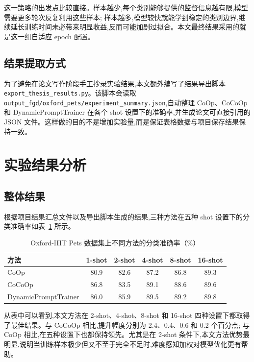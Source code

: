 这一策略的出发点比较直接。样本越少,每个类别能够提供的监督信息越有限,模型需要更多轮次反复利用这些样本; 样本越多,模型较快就能学到稳定的类别边界,继续延长训练时间未必带来明显收益,反而可能加剧过拟合。本文最终结果采用的就是这一组自适应 epoch 配置。

\subsection{结果提取方式}

为了避免在论文写作阶段手工抄录实验结果,本文额外编写了结果导出脚本 \texttt{export\_thesis\_results.py}。该脚本会读取 \texttt{output\_fgd/oxford\_pets/experiment\_summary.json},自动整理 CoOp、CoCoOp 和 DynamicPromptTrainer 在各个 shot 设置下的准确率,并生成论文可直接引用的 JSON 文件。这样做的目的不是增加实验量,而是保证表格数据与项目保存结果保持一致。

\section{实验结果分析}

\subsection{整体结果}

根据项目结果汇总文件以及导出脚本生成的结果,三种方法在五种 shot 设置下的分类准确率如表~\ref{tab:main_results} 所示。

\begin{table}[H]
\centering
\caption{Oxford-IIIT Pets 数据集上不同方法的分类准确率（\%）}
\label{tab:main_results}
\begin{tabular}{lccccc}
\toprule
方法 & 1-shot & 2-shot & 4-shot & 8-shot & 16-shot \\
\midrule
CoOp & 80.9 & 82.6 & 87.2 & 86.8 & 89.3 \\
CoCoOp & 86.8 & 83.5 & 89.1 & 88.6 & 89.6 \\
DynamicPromptTrainer & 86.0 & 85.9 & 89.5 & 89.2 & 89.8 \\
\bottomrule
\end{tabular}
\end{table}

从表中可以看到,本文方法在 2-shot、4-shot、8-shot 和 16-shot 四种设置下都取得了最佳结果。与 CoCoOp 相比,提升幅度分别为 2.4、0.4、0.6 和 0.2 个百分点; 与 CoOp 相比,在五种设置下也都保持领先。尤其是在 2-shot 条件下,本文方法优势最明显,说明当训练样本极少但又不至于完全不足时,难度感知加权对模型优化更有帮助。


